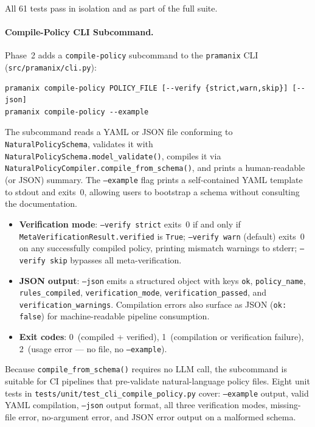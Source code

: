 \documentclass[12pt,a4paper,oneside]{report}
\newcommand{\fname}[1]{\texttt{#1}}          %
\newcommand{\code}[1]{\texttt{#1}}           %
\begin{document}
All 61 tests pass in isolation and as part of the full suite.

\paragraph{Compile-Policy CLI Subcommand.}
Phase~2 adds a \code{compile-policy} subcommand to the \code{pramanix} CLI
(\fname{src/pramanix/cli.py}):

\begin{verbatim}
pramanix compile-policy POLICY_FILE [--verify {strict,warn,skip}] [--json]
pramanix compile-policy --example
\end{verbatim}

The subcommand reads a YAML or JSON file conforming to
\code{NaturalPolicySchema}, validates it with
\code{NaturalPolicySchema.model\_validate()}, compiles it via
\code{NaturalPolicyCompiler.compile\_from\_schema()}, and prints a
human-readable (or JSON) summary.  The \code{--example} flag prints a
self-contained YAML template to stdout and exits~0, allowing users to
bootstrap a schema without consulting the documentation.

\begin{itemize}
  \item \textbf{Verification mode}: \code{--verify strict} exits~0 if and
        only if \code{MetaVerificationResult.verified} is \code{True};
        \code{--verify warn} (default) exits~0 on any successfully compiled
        policy, printing mismatch warnings to stderr;
        \code{--verify skip} bypasses all meta-verification.
  \item \textbf{JSON output}: \code{--json} emits a structured object with
        keys \code{ok}, \code{policy\_name}, \code{rules\_compiled},
        \code{verification\_mode}, \code{verification\_passed}, and
        \code{verification\_warnings}.  Compilation errors also surface as
        JSON (\code{ok: false}) for machine-readable pipeline consumption.
  \item \textbf{Exit codes}: 0~(compiled + verified), 1~(compilation or
        verification failure), 2~(usage error — no file, no \code{--example}).
\end{itemize}

Because \code{compile\_from\_schema()} requires no LLM call, the subcommand
is suitable for CI pipelines that pre-validate natural-language policy files.
Eight unit tests in \fname{tests/unit/test\_cli\_compile\_policy.py} cover:
\code{--example} output, valid YAML compilation, \code{--json} output format,
all three verification modes, missing-file error, no-argument error, and JSON
error output on a malformed schema.
\end{document}
